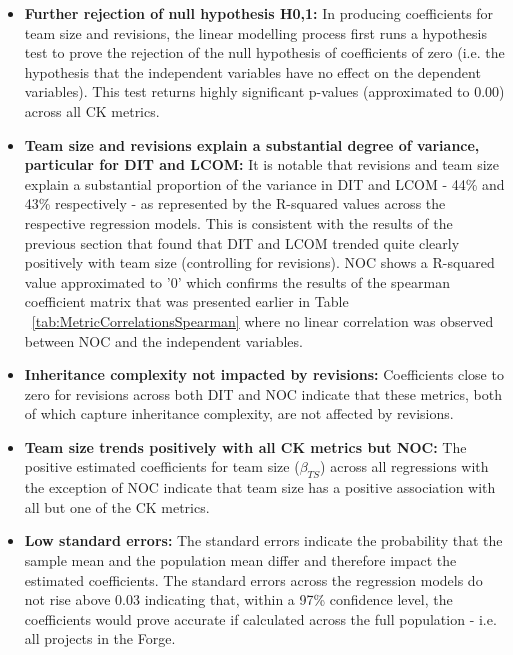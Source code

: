 \begin{itemize}
\item  \textbf{Further rejection of null hypothesis H0,1:} In producing coefficients for team size and revisions, the linear modelling process first runs a hypothesis test to prove the rejection of the null hypothesis of coefficients of zero (i.e. the hypothesis that the independent variables have no effect on the dependent variables). This test returns highly significant p-values (approximated to 0.00) across all CK metrics.

\item  \textbf{Team size and revisions explain a substantial degree of variance, particular for DIT and LCOM:} It is notable that revisions and team size explain a substantial proportion of the variance in DIT and LCOM - 44\% and 43\% respectively - as represented by the R-squared values across the respective regression models. This is consistent with the results of the previous section that found that DIT and LCOM trended quite clearly positively with team size (controlling for revisions). NOC shows a R-squared value approximated to '0' which confirms the results of the spearman coefficient matrix that was presented earlier in Table ~\ref{tab:MetricCorrelationsSpearman} where no linear correlation was observed between NOC and the independent variables.

\item  \textbf{Inheritance complexity not impacted by revisions:} Coefficients close to zero for revisions across both DIT and NOC indicate that these metrics, both of which capture inheritance complexity, are not affected by revisions.

\item  \textbf{Team size trends positively with all CK metrics but NOC:} The positive estimated coefficients for team size ($\beta_{TS}$) across all regressions with the exception of NOC indicate that team size has a positive association with all but one of the CK metrics.

\item  \textbf{Low standard errors:} The standard errors indicate the probability that the sample mean and the population mean differ and therefore impact the estimated coefficients. The standard errors across the regression models do not rise above 0.03 indicating that, within a 97\% confidence level, the coefficients would prove accurate if calculated across the full population - i.e. all projects in the Forge.

\end{itemize}

